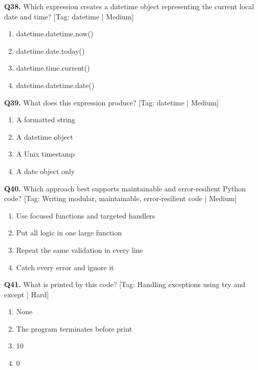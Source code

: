 \vspace{2mm}
\noindent\textbf{Q38.} Which expression creates a datetime object representing the current local date and time? \hfill [Tag: datetime | Medium]
\begin{enumerate}[label=(\alph*),topsep=2pt,itemsep=1pt,partopsep=0pt,parsep=0pt]
    \item {datetime.datetime.now()}
    \item {datetime.date.today()}
    \item {datetime.time.current()}
    \item {datetime.datetime.date()}
\end{enumerate}
\vspace{2mm}
\noindent\textbf{Q39.} What does this expression produce? \hfill [Tag: datetime | Medium]
\begin{enumerate}[label=(\alph*),topsep=2pt,itemsep=1pt,partopsep=0pt,parsep=0pt]
    \item {A formatted string}
    \item {A datetime object}
    \item {A Unix timestamp}
    \item {A date object only}
\end{enumerate}
\vspace{2mm}
\noindent\textbf{Q40.} Which approach best supports maintainable and error-resilient Python code? \hfill [Tag: Writing modular, maintainable, error-resilient code | Medium]
\begin{enumerate}[label=(\alph*),topsep=2pt,itemsep=1pt,partopsep=0pt,parsep=0pt]
    \item {Use focused functions and targeted handlers}
    \item {Put all logic in one large function}
    \item {Repeat the same validation in every line}
    \item {Catch every error and ignore it}
\end{enumerate}
\vspace{2mm}
\noindent\textbf{Q41.} What is printed by this code? \hfill [Tag: Handling exceptions using try and except | Hard]
\begin{enumerate}[label=(\alph*),topsep=2pt,itemsep=1pt,partopsep=0pt,parsep=0pt]
    \item {None}
    \item {The program terminates before print}
    \item {10}
    \item {0}
\end{enumerate}

